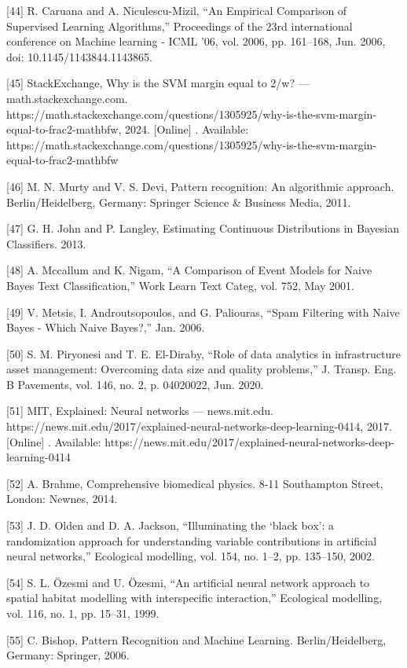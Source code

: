 \documentclass[sn-mathphys-num]{sn-jnl}%
\begin{document}
[44] R. Caruana and A. Niculescu-Mizil, “An Empirical Comparison of Supervised Learning Algorithms,” Proceedings of the 23rd international conference on Machine learning - ICML ’06, vol. 2006, pp. 161–168, Jun. 2006, doi: 10.1145/1143844.1143865.

[45] StackExchange, Why is the SVM margin equal to 2/w? — math.stackexchange.com. https://math.stackexchange.com/questions/1305925/why-is-the-svm-margin-equal-to-frac2-mathbfw, 2024. [Online] . Available: https://math.stackexchange.com/questions/1305925/why-is-the-svm-margin-equal-to-frac2-mathbfw

[46] M. N. Murty and V. S. Devi, Pattern recognition: An algorithmic approach. Berlin/Heidelberg, Germany: Springer Science & Business Media, 2011.

[47] G. H. John and P. Langley, Estimating Continuous Distributions in Bayesian Classifiers. 2013.

[48] A. Mccallum and K. Nigam, “A Comparison of Event Models for Naive Bayes Text Classification,” Work Learn Text Categ, vol. 752, May 2001.

[49] V. Metsis, I. Androutsopoulos, and G. Paliouras, “Spam Filtering with Naive Bayes - Which Naive Bayes?,” Jan. 2006.

[50] S. M. Piryonesi and T. E. El-Diraby, “Role of data analytics in infrastructure asset management: Overcoming data size and quality problems,” J. Transp. Eng. B Pavements, vol. 146, no. 2, p. 04020022, Jun. 2020.

[51] MIT, Explained: Neural networks — news.mit.edu. https://news.mit.edu/2017/explained-neural-networks-deep-learning-0414, 2017. [Online] . Available: https://news.mit.edu/2017/explained-neural-networks-deep-learning-0414

[52] A. Brahme, Comprehensive biomedical physics. 8-11 Southampton Street, London: Newnes, 2014.

[53] J. D. Olden and D. A. Jackson, “Illuminating the ‘black box’: a randomization approach for understanding variable contributions in artificial neural networks,” Ecological modelling, vol. 154, no. 1–2, pp. 135–150, 2002.

[54] S. L. Özesmi and U. Özesmi, “An artificial neural network approach to spatial habitat modelling with interspecific interaction,” Ecological modelling, vol. 116, no. 1, pp. 15–31, 1999.

[55] C. Bishop, Pattern Recognition and Machine Learning. Berlin/Heidelberg, Germany: Springer, 2006.
\end{document}
